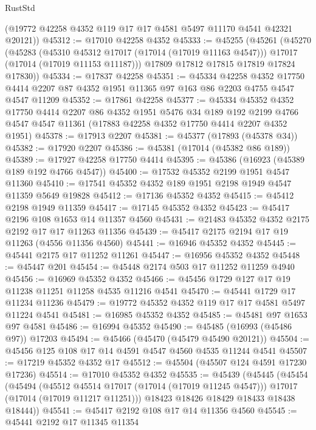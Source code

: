 \begin{lexlean}{RustStd}
\begin{coremodule}
      (@19772 @42258 @4352 @119 @17 @17 @4581 @5497 @11170 @4541 @42321 @20121))
@45312 := @17010 @42258 @4352
@45333 := @45255
    (@45261
      (@45270
        (@45283
          (@45310 @45312 @17017 (@17014 (@17019 @11163 @4547)))
          @17017
          (@17014 (@17019 @11153 @11187)))
        @17809
        @17812
        @17815
        @17819
        @17824
        @17830))
@45334 := @17837 @42258
@45351 := @45334
    @42258
    @4352
    @17750
    @4414
    @2207
    @87
    @4352
    @1951
    @11365
    @97
    @163
    @86
    @2203
    @4755
    @4547
    @4547
    @11209
@45352 := @17861 @42258
@45377 := @45334
    @45352
    @4352
    @17750
    @4414
    @2207
    @86
    @4352
    @1951
    @5476
    @34
    @189
    @192
    @2199
    @4766
    @4547
    @4547
    @11361
    (@17883 @42258 @4352 @17750 @4414 @2207 @4352 @1951)
@45378 := @17913 @2207
@45381 := @45377 (@17893 (@45378 @34))
@45382 := @17920 @2207
@45386 := @45381 (@17014 (@45382 @86 @189))
@45389 := @17927 @42258 @17750 @4414
@45395 := @45386 (@16923 (@45389 @189 @192 @4766 @4547))
@45400 := @17532 @45352 @2199 @1951 @4547 @11360
@45410 := @17541 @45352 @4352 @189 @1951 @2198 @1949 @4547 @11359 @5649 @19828
@45412 := @17136 @45352 @4352
@45415 := @45412 @2198 @1949 @11359
@45417 := @17145 @45352 @4352
@45423 := @45417 @2196 @108 @1653 @14 @11357 @4560
@45431 := @21483 @45352 @4352 @2175 @2192 @17 @17 @11263 @11356
@45439 := @45417 @2175 @2194 @17 @19 @11263 (@4556 @11356 @4560)
@45441 := @16946 @45352 @4352
@45445 := @45441 @2175 @17 @11252 @11261
@45447 := @16956 @45352 @4352
@45448 := @45447 @201
@45454 := @45448 @2174 @503 @17 @11252 @11259 @4940
@45456 := @16969 @45352 @4352
@45466 := @45456 @1729 @127 @17 @19 @11238 @11251 @11258 @4535 @11216 @4541
@45470 := @45441 @1729 @17 @11234 @11236
@45479 := @19772 @45352 @4352 @119 @17 @17 @4581 @5497 @11224 @4541
@45481 := @16985 @45352 @4352
@45485 := @45481 @97 @1653 @97 @4581
@45486 := @16994 @45352
@45490 := @45485 (@16993 (@45486 @97)) @17203
@45494 := @45466 (@45470 (@45479 @45490 @20121))
@45504 := @45456 @125 @108 @17 @14 @4591 @4547 @4560 @4535 @11244 @4541
@45507 := @17219 @45352 @4352 @17
@45512 := @45504 (@45507 @124 @4591 @17230 @17236)
@45514 := @17010 @45352 @4352
@45535 := @45439
    (@45445
      (@45454
        (@45494
          (@45512 @45514 @17017 (@17014 (@17019 @11245 @4547)))
          @17017
          (@17014 (@17019 @11217 @11251)))
        @18423
        @18426
        @18429
        @18433
        @18438
        @18444))
@45541 := @45417 @2192 @108 @17 @14 @11356 @4560
@45545 := @45441 @2192 @17 @11345 @11354

\end{coremodule}
\end{lexlean}
